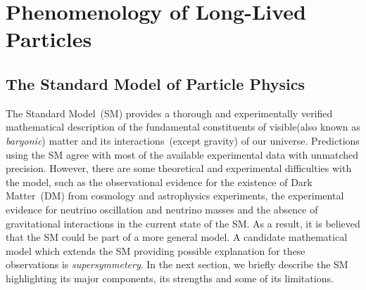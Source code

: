
\chapter{Phenomenology of Long-Lived Particles}
\label{Long_Lived_Particle_physics_chapter}


\section{The Standard Model of Particle Physics}
The Standard Model~(SM) provides a thorough and experimentally verified mathematical description of the fundamental constituents of visible(also known as \textit{baryonic}) matter and its interactions~(except gravity) of our universe. Predictions using the SM agree with most of the available experimental data with unmatched precision.
However, there are some theoretical and experimental difficulties with the model, such as the observational evidence for the existence of Dark Matter~(DM) from cosmology and astrophysics experiments, the experimental evidence for neutrino oscillation and neutrino masses and the absence of gravitational interactions in the current state of the SM. As a result, it is believed that the SM could be part of a more general model. A candidate mathematical model which extends the SM providing possible explanation for these observations is \textit{supersymmetery}.
In the next section, we briefly describe the SM highlighting its major components, its strengths and some of its limitations.
